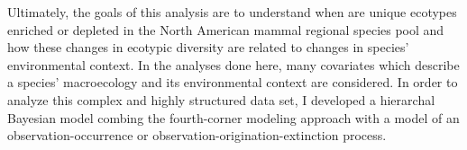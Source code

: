 \documentclass[12pt,letterpaper]{article}
\begin{document}
Ultimately, the goals of this analysis are to understand when are unique ecotypes enriched or depleted in the North American mammal regional species pool and how these changes in ecotypic diversity are related to changes in species' environmental context. In the analyses done here, many covariates which describe a species' macroecology and its environmental context are considered. In order to analyze this complex and highly structured data set, I developed a hierarchal Bayesian model combing the fourth-corner modeling approach with a model of an observation-occurrence or observation-origination-extinction process. %
\end{document}
